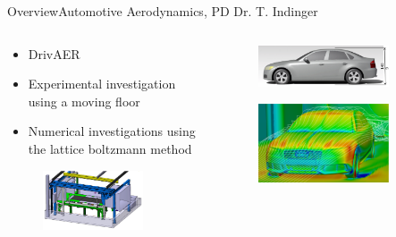 \documentclass[AERbeamer%
              ,optEnglish%
              ,optBiber%
              ,optBibstyleAlphabetic%
              ,optBeamerClassicFormat%
              ]{AERlatex}%
\begin{document}
\begin{frame}[c]{Overview}{Automotive Aerodynamics, PD Dr. T. Indinger}
    \centering
    \begin{columns}[T]
        \begin{column}{0.48\textwidth}
            \begin{itemize}
                \item DrivAER
                \item Experimental investigation using a moving floor
                \item Numerical investigations using the lattice boltzmann method
            \end{itemize}
            \begin{figure}
                \centering
                \includegraphics[width=0.8\textwidth]{Indinger1.png}
            \end{figure}
        \end{column}
        \begin{column}{0.48\textwidth}
            \begin{figure}
                \centering
                \includegraphics[width=0.8\textwidth]{Indinger3.png}
            \end{figure}
            \begin{figure}
                \centering
                \includegraphics[width=0.8\textwidth]{Indinger2.png}

\end{figure}
\end{column}
\end{columns}
\end{frame}
\end{document}
